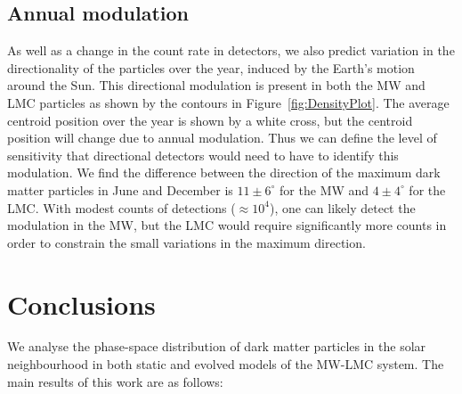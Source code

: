 \documentclass[fleqn,usenatbib]{mnras}
\begin{document}
\vspace{-0.3cm}
\subsection{Annual modulation}
As well as a change in the count rate in detectors, we also predict variation in the directionality of the particles over the year, induced by the Earth's motion around the Sun. This directional modulation is present in both the MW and LMC particles as shown by the contours in Figure~\ref{fig:DensityPlot}. The average centroid position over the year is shown by a white cross, but the centroid position will change due to annual modulation. Thus we can define the level of sensitivity that directional detectors would need to have to identify this modulation. We find the difference between the direction of the maximum dark matter particles in June and December is $11 \pm 6 ^{\circ}$ for the MW and $4 \pm 4 ^{\circ}$ for the LMC. With modest counts of detections ($\approx10^4$), one can likely detect the modulation in the MW, but the LMC would require significantly more counts in order to constrain the small variations in the maximum direction.

\vspace{-0.4cm}
\section{Conclusions} \label{Section:Conclusions}
We analyse the phase-space distribution of dark matter particles in the solar neighbourhood in both static and evolved models of the MW-LMC system. The main results of this work are as follows:
\end{document}
